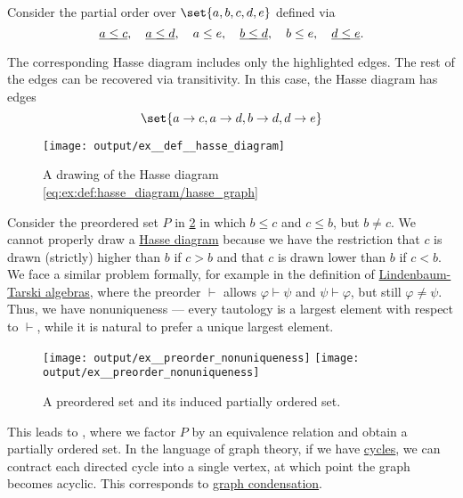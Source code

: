 \begin{example}\label{ex:def:hasse_diagram}
  Consider the partial order over \( \set{ a, b, c, d, e } \) defined via
  \begin{equation}\label{eq:ex:def:hasse_diagram/partially ordered set}
    \underline{\smash{a \leq c}},\quad \underline{\smash{a \leq d}},\quad a \leq e,\quad \underline{\smash{b \leq d}},\quad b \leq e,\quad \underline{\smash{d \leq e}}.
  \end{equation}

  The corresponding Hasse diagram includes only the highlighted edges. The rest of the edges can be recovered via transitivity. In this case, the Hasse diagram has edges
  \begin{equation}\label{eq:ex:def:hasse_diagram/hasse_graph}
    \set{ a \to c, a \to d, b \to d, d \to e }
  \end{equation}

  \begin{figure}[!ht]
    \centering
    \texttt{[image: output/ex\_\_def\_\_hasse\_diagram]}
    \caption{A drawing of the Hasse diagram \eqref{eq:ex:def:hasse_diagram/hasse_graph}}
    \label{fig:ex:def:hasse_diagram}
  \end{figure}
\end{example}

\begin{example}\label{ex:preorder_nonuniqueness}
  Consider the preordered set \( P \) in \cref{fig:ex:preorder_nonuniqueness} in which \( b \leq c \) and \( c \leq b \), but \( b \neq c \). We cannot properly draw a \hyperref[def:hasse_diagram]{Hasse diagram} because we have the restriction that \( c \) is drawn (strictly) higher than \( b \) if \( c > b \) and that \( c \) is drawn lower than \( b \) if \( c < b \). We face a similar problem formally, for example in the definition of \hyperref[def:lindenbaum_tarski_algebra]{Lindenbaum-Tarski algebras}, where the preorder \( \vdash \) allows \( \varphi \vdash \psi \) and \( \psi \vdash \varphi \), but still \( \varphi \neq \psi \). Thus, we have nonuniqueness --- every tautology is a largest element with respect to \( \vdash \), while it is natural to prefer a unique largest element.

  \begin{figure}[!ht]
    \hfill
    \texttt{[image: output/ex\_\_preorder\_nonuniqueness]}
    \hfill
    \texttt{[image: output/ex\_\_preorder\_nonuniqueness]}
    \hfill\hfill
    \caption{A preordered set and its induced partially ordered set.}
    \label{fig:ex:preorder_nonuniqueness}
  \end{figure}

  This leads to , where we factor \( P \) by an equivalence relation and obtain a partially ordered set. In the language of graph theory, if we have \hyperref[def:graph_cycle]{cycles}, we can contract each directed cycle into a single vertex, at which point the graph becomes acyclic. This corresponds to \hyperref[def:directed_graph_condensation]{graph condensation}.
\end{example}

